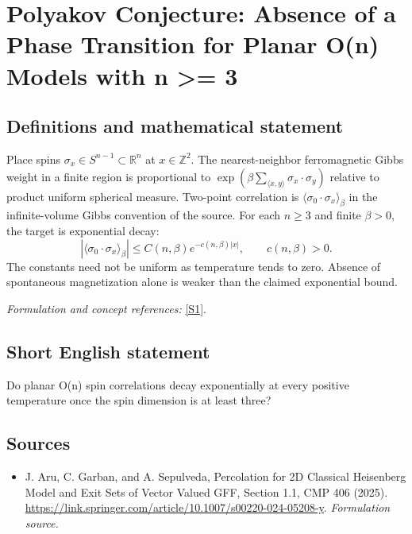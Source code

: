 \documentclass[11pt]{article}
\begin{document}
\section*{\texorpdfstring{Polyakov Conjecture: Absence of a Phase Transition for Planar O(n) Models with n >= 3}{Polyakov Conjecture: Absence of a Phase Transition for Planar O(n) Models with n >= 3}}\label{187}
\subsection{Definitions and mathematical statement}
Place spins $\sigma_x\in S^{n-1}\subset{\mathbb{R}}^n$ at $x\in{\mathbb{Z}}^2$. The nearest-neighbor ferromagnetic Gibbs weight in a finite region is proportional to
$\exp(\beta\sum_{\langle x,y\rangle}\sigma_x\cdot\sigma_y)$ relative to product uniform spherical measure. Two-point correlation is $\langle\sigma_0\cdot\sigma_x\rangle_\beta$ in the infinite-volume Gibbs convention of the source. For each $n\ge3$ and finite $\beta>0$, the target is exponential decay:
\[
 |\langle\sigma_0\cdot\sigma_x\rangle_\beta|\le C(n,\beta)e^{-c(n,\beta)|x|},
 \qquad c(n,\beta)>0.
\]
The constants need not be uniform as temperature tends to zero. Absence of spontaneous magnetization alone is weaker than the claimed exponential bound.
\par\smallskip\textit{Formulation and concept references:} \href{https://link.springer.com/article/10.1007/s00220-024-05208-y}{[S1]}.

\subsection{Short English statement}
Do planar O(n) spin correlations decay exponentially at every positive temperature once the spin dimension is at least three?
\subsection{Sources}
\begin{itemize}
\item[S1]J. Aru, C. Garban, and A. Sepulveda, Percolation for 2D Classical Heisenberg Model and Exit Sets of Vector Valued GFF, Section 1.1, CMP 406 (2025).
\url{https://link.springer.com/article/10.1007/s00220-024-05208-y}.
\textit{Formulation source.}
\end{itemize}
\end{document}
